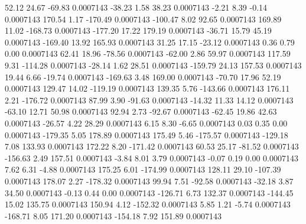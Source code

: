       52.12       24.67      -69.83     0.0007143
      -38.23        1.58       38.23     0.0007143
       -2.21        8.39       -0.14     0.0007143
      170.54        1.17     -170.49     0.0007143
     -100.47        8.02       92.65     0.0007143
      169.89       11.02     -168.73     0.0007143
     -177.20       17.22      179.19     0.0007143
      -36.71       15.79       45.19     0.0007143
     -169.40       13.92      165.93     0.0007143
       31.25       17.15      -23.12     0.0007143
        0.36        0.79        0.00     0.0007143
       62.41       18.96      -78.56     0.0007143
      -62.00        2.86       59.97     0.0007143
      117.59        9.31     -114.28     0.0007143
      -28.14        1.62       28.51     0.0007143
     -159.79       24.13      157.53     0.0007143
       19.44        6.66      -19.74     0.0007143
     -169.63        3.48      169.00     0.0007143
      -70.70       17.96       52.19     0.0007143
      129.47       14.02     -119.19     0.0007143
      139.35        5.76     -143.66     0.0007143
      176.11        2.21     -176.72     0.0007143
       87.99        3.90      -91.63     0.0007143
      -14.32       11.33       14.12     0.0007143
      -63.10       12.71       50.98     0.0007143
       92.94        2.73      -92.67     0.0007143
      -62.45       19.86       42.63     0.0007143
      -26.57        4.22       28.29     0.0007143
        6.15        8.30       -6.65     0.0007143
        0.03        0.35        0.00     0.0007143
     -179.35        5.05      178.89     0.0007143
      175.49        5.46     -175.57     0.0007143
     -129.18        7.08      133.93     0.0007143
      172.22        8.20     -171.42     0.0007143
       60.53       25.17      -81.52     0.0007143
     -156.63        2.49      157.51     0.0007143
       -3.84        8.01        3.79     0.0007143
       -0.07        0.19        0.00     0.0007143
        7.62        6.31       -4.88     0.0007143
      175.25        6.01     -174.99     0.0007143
      128.11       29.10     -107.39     0.0007143
      178.07        2.27     -178.32     0.0007143
       99.94        7.51      -92.58     0.0007143
      -32.18        3.87       34.50     0.0007143
       -0.13        0.44        0.00     0.0007143
     -126.71        6.73      132.37     0.0007143
     -144.45       15.02      135.75     0.0007143
      150.94        4.12     -152.32     0.0007143
        5.85        1.21       -5.74     0.0007143
     -168.71        8.05      171.20     0.0007143
     -154.18        7.92      151.89     0.0007143
